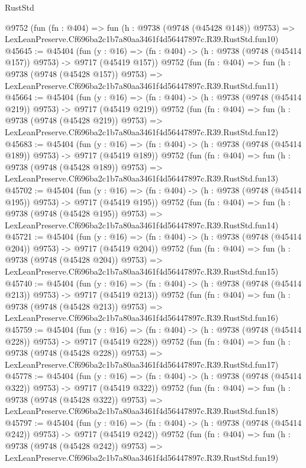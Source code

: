 \begin{lexlean}{RustStd}
\begin{coremodule}
    @9752
    (fun (fn : @404) =>
    fun (h : @9738 (@9748 (@45428 @148)) @9753) =>
    LexLeanPreserve.Cf696ba2c1b7a80aa3461f4d56447897c.R39.RustStd.fun10)
@45645 := @45404
    (fun (y : @16) => (fn : @404) -> (h : @9738 (@9748 (@45414 @157)) @9753) -> @9717 (@45419 @157))
    @9752
    (fun (fn : @404) =>
    fun (h : @9738 (@9748 (@45428 @157)) @9753) =>
    LexLeanPreserve.Cf696ba2c1b7a80aa3461f4d56447897c.R39.RustStd.fun11)
@45664 := @45404
    (fun (y : @16) => (fn : @404) -> (h : @9738 (@9748 (@45414 @219)) @9753) -> @9717 (@45419 @219))
    @9752
    (fun (fn : @404) =>
    fun (h : @9738 (@9748 (@45428 @219)) @9753) =>
    LexLeanPreserve.Cf696ba2c1b7a80aa3461f4d56447897c.R39.RustStd.fun12)
@45683 := @45404
    (fun (y : @16) => (fn : @404) -> (h : @9738 (@9748 (@45414 @189)) @9753) -> @9717 (@45419 @189))
    @9752
    (fun (fn : @404) =>
    fun (h : @9738 (@9748 (@45428 @189)) @9753) =>
    LexLeanPreserve.Cf696ba2c1b7a80aa3461f4d56447897c.R39.RustStd.fun13)
@45702 := @45404
    (fun (y : @16) => (fn : @404) -> (h : @9738 (@9748 (@45414 @195)) @9753) -> @9717 (@45419 @195))
    @9752
    (fun (fn : @404) =>
    fun (h : @9738 (@9748 (@45428 @195)) @9753) =>
    LexLeanPreserve.Cf696ba2c1b7a80aa3461f4d56447897c.R39.RustStd.fun14)
@45721 := @45404
    (fun (y : @16) => (fn : @404) -> (h : @9738 (@9748 (@45414 @204)) @9753) -> @9717 (@45419 @204))
    @9752
    (fun (fn : @404) =>
    fun (h : @9738 (@9748 (@45428 @204)) @9753) =>
    LexLeanPreserve.Cf696ba2c1b7a80aa3461f4d56447897c.R39.RustStd.fun15)
@45740 := @45404
    (fun (y : @16) => (fn : @404) -> (h : @9738 (@9748 (@45414 @213)) @9753) -> @9717 (@45419 @213))
    @9752
    (fun (fn : @404) =>
    fun (h : @9738 (@9748 (@45428 @213)) @9753) =>
    LexLeanPreserve.Cf696ba2c1b7a80aa3461f4d56447897c.R39.RustStd.fun16)
@45759 := @45404
    (fun (y : @16) => (fn : @404) -> (h : @9738 (@9748 (@45414 @228)) @9753) -> @9717 (@45419 @228))
    @9752
    (fun (fn : @404) =>
    fun (h : @9738 (@9748 (@45428 @228)) @9753) =>
    LexLeanPreserve.Cf696ba2c1b7a80aa3461f4d56447897c.R39.RustStd.fun17)
@45778 := @45404
    (fun (y : @16) => (fn : @404) -> (h : @9738 (@9748 (@45414 @322)) @9753) -> @9717 (@45419 @322))
    @9752
    (fun (fn : @404) =>
    fun (h : @9738 (@9748 (@45428 @322)) @9753) =>
    LexLeanPreserve.Cf696ba2c1b7a80aa3461f4d56447897c.R39.RustStd.fun18)
@45797 := @45404
    (fun (y : @16) => (fn : @404) -> (h : @9738 (@9748 (@45414 @242)) @9753) -> @9717 (@45419 @242))
    @9752
    (fun (fn : @404) =>
    fun (h : @9738 (@9748 (@45428 @242)) @9753) =>
    LexLeanPreserve.Cf696ba2c1b7a80aa3461f4d56447897c.R39.RustStd.fun19)

\end{coremodule}
\end{lexlean}
